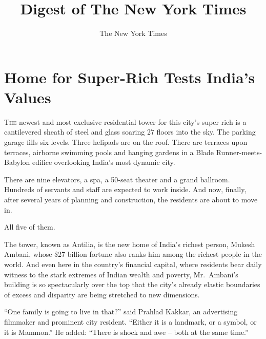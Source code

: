 ﻿\documentclass[12pt]{article}
\title{Digest of The New York Times}
\author{The New York Times}
\begin{document}
\date{}

\cfoot{\textsf{\thepage}}

\tableofcontents

\clearpage
\setcounter{page}{1}

\section{Home for Super-Rich Tests India's Values}

\lettrine{T}{he} newest and most exclusive residential tower for this city's
super rich is a cantilevered sheath of steel and glass soaring 27 floors into the sky. The parking
garage fills six levels. Three helipads are on the roof. There are terraces upon terraces, airborne
swimming pools and hanging gardens in a Blade Runner-meets-Babylon edifice overlooking India's most
dynamic city.

There are nine elevators, a spa, a 50-seat theater and a grand ballroom. Hundreds of servants and
staff are expected to work inside. And now, finally, after several years of planning and
construction, the residents are about to move in.

All five of them.

The tower, known as Antilia, is the new home of India's richest person, Mukesh Ambani, whose \$27
billion fortune also ranks him among the richest people in the world. And even here in the country's
financial capital, where residents bear daily witness to the stark extremes of Indian wealth and
poverty, Mr.~Ambani's building is so spectacularly over the top that the city's already elastic
boundaries of excess and disparity are being stretched to new dimensions.

``One family is going to live in that?'' said Prahlad Kakkar, an advertising filmmaker and prominent
city resident. ``Either it is a landmark, or a symbol, or it is Mammon.'' He added: ``There is shock
and awe -- both at the same time.''
\end{document}
